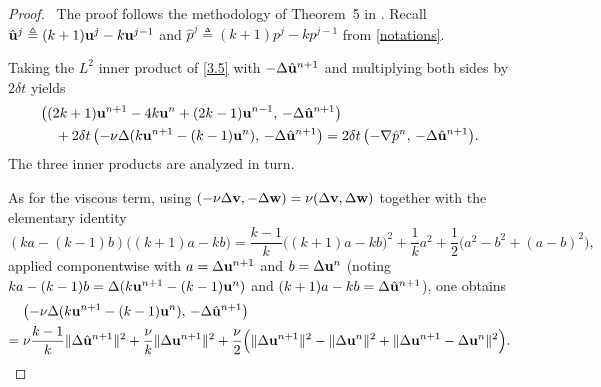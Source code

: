 \documentclass{article}
\theoremstyle{definition}                   %
\begin{document}
\begin{proof}
\,\newline
The proof follows the methodology of Theorem~5 in \cite{HuangShen2023}. Recall 
$\hat{\bf u}^j\triangleq(k+1){\bf u}^j-k{\bf u}^{j-1}$ and
$\hat p^j\triangleq(k+1)p^j-kp^{j-1}$ from \eqref{notations}.

Taking the $L^2$ inner product of \eqref{3.5} with
$-\Delta\hat{\bf u}^{n+1}$ and multiplying both sides by $2\delta t$ yields
\begin{align}
&\bigl((2k+1){\bf u}^{n+1}-4k{\bf u}^{n}+(2k-1){\bf u}^{n-1},\,-\Delta\hat{\bf u}^{n+1}\bigr) \notag\\
&\quad+2\delta t\,\bigl(-\nu\Delta(k{\bf u}^{n+1}-(k-1){\bf u}^n),\,-\Delta\hat{\bf u}^{n+1}\bigr)
=2\delta t\,\bigl(-\nabla\hat p^n,\,-\Delta\hat{\bf u}^{n+1}\bigr).
\label{3.7a-new}
\end{align}
The three inner products are analyzed in turn.

As for the viscous term, using
$(-\nu\Delta{\bf v},-\Delta{\bf w})=\nu(\Delta{\bf v},\Delta{\bf w})$
together with the elementary identity
\begin{equation}
(ka-(k-1)b)\bigl((k+1)a-kb\bigr)
=\frac{k-1}{k}\bigl((k+1)a-kb\bigr)^2+\frac{1}{k}a^2+\frac{1}{2}\bigl(a^2-b^2+(a-b)^2\bigr),
\label{3.7b-new}
\end{equation}
applied componentwise with $a=\Delta{\bf u}^{n+1}$ and $b=\Delta{\bf u}^n$
(noting $ka-(k-1)b=\Delta(k{\bf u}^{n+1}-(k-1){\bf u}^n)$ and
$(k+1)a-kb=\Delta\hat{\bf u}^{n+1}$), one obtains
\begin{align}
&\bigl(-\nu\Delta(k{\bf u}^{n+1}-(k-1){\bf u}^n),\,-\Delta\hat{\bf u}^{n+1}\bigr) \notag\\
=\;& \nu\frac{k-1}{k}\|\Delta\hat{\bf u}^{n+1}\|^2
+\frac{\nu}{k}\|\Delta{\bf u}^{n+1}\|^2
+\frac{\nu}{2}\Bigl(\|\Delta{\bf u}^{n+1}\|^2-\|\Delta{\bf u}^n\|^2+\|\Delta{\bf u}^{n+1}-\Delta{\bf u}^n\|^2\Bigr).
\label{3.8}
\end{align}



\end{proof}
\end{document}

